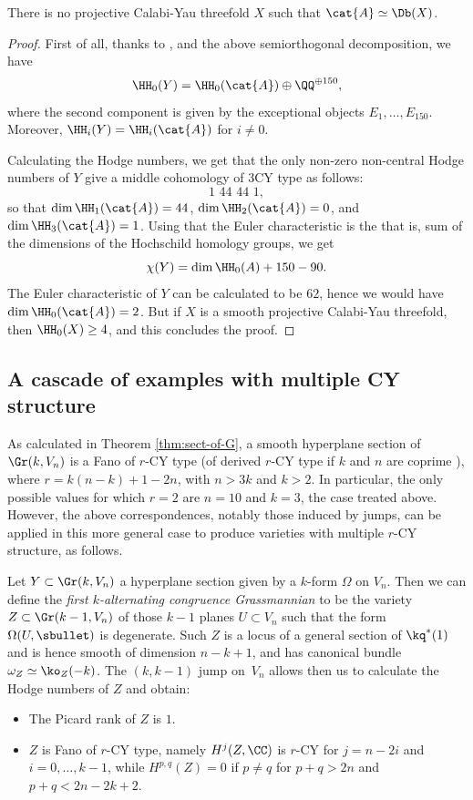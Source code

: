 \begin{prop}
There is no projective Calabi-Yau threefold $X$ such that $\cat{A} \simeq \Db(X)$.
\end{prop}
\begin{proof}
First of all, thanks to \cite{kuz-hochsch}, and the above semiorthogonal decomposition, we have
\[
\HH_0(Y)=\HH_0(\cat{A}) \oplus \QQ^{\oplus 150},
\]
where the second component is given by the exceptional objects $E_1,\ldots,E_{150}$.
Moreover, $\HH_i(Y)=\HH_i(\cat{A})$ for $i \neq 0$.

Calculating the Hodge numbers, we get that the only non-zero non-central Hodge numbers
of $Y$ give a middle cohomology of 3CY type as follows:
\[
1 \,\, 44 \,\, 44 \,\, 1,
\]
so that $\dim \HH_1(\cat{A})=44$, $\dim \HH_2(\cat{A})=0$, and $\dim \HH_3(\cat{A})=1$.
Using that the Euler characteristic is the that is,  sum of the dimensions of the Hochschild homology groups, we get
\[
\chi(Y)=\dim \HH_0(A) + 150 - 90.
\]
The Euler characteristic of $Y$ can be calculated to be $62$,
hence we would have $\dim \HH_0(\cat{A})=2$. But
if $X$ is a smooth projective Calabi-Yau threefold, then $\HH_0(X) \geq 4$, and this concludes the
proof.
\end{proof}

\subsection{A cascade of examples with multiple CY structure}
As calculated in Theorem \ref{thm:sect-of-G}, a smooth hyperplane
section of $\Gr(k,V_n)$ is a Fano of $r$-CY type (of derived $r$-CY type if $k$ and $n$ are
coprime \cite{kuz-fractional}), where $r=k(n-k)+1-2n$, with $n>3k$ and $k>2$. In particular,
the only possible values for which $r=2$ are $n=10$ and $k=3$, the case treated above.
However, the above correspondences, notably those induced by jumps, can be applied in this more
general case to produce varieties with multiple $r$-CY structure, as follows.

Let $Y \subset \Gr(k,V_n)$ a hyperplane section given by a $k$-form $\Omega$ on $V_n$.
Then we can define the {\it first $k$-alternating congruence Grassmannian} to be the variety
$Z \subset \Gr(k-1,V_n)$ of those $k-1$ planes $U \subset V_n$ such that the form
$\Omega(U,\sbullet)$ is degenerate. Such $Z$ is a locus of a general section of
$\kq^*(1)$ and is hence smooth of dimension $n-k+1$, and has canonical bundle
$\omega_Z \simeq \ko_Z(-k)$. The $(k,k-1)$ jump on~$V_n$ allows then us to calculate the
Hodge numbers of $Z$ and obtain:
\begin{itemize}
\item The Picard rank of $Z$ is $1$.
\item $Z$ is Fano of $r$-CY type, namely $H^j(Z,\CC)$ is $r$-CY for $j=n-2i$
and $i=0,\ldots,k-1$, while $H^{p,q}(Z)=0$ if $p\neq q$ for $p+q > 2n$ and
$p+q < 2n-2k+2$.
\end{itemize}

